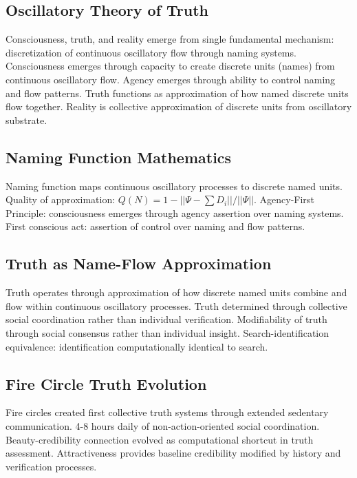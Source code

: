 \documentclass[12pt,a4paper]{article}
\begin{document}
\subsection{Oscillatory Theory of Truth}

Consciousness, truth, and reality emerge from single fundamental mechanism: discretization of continuous oscillatory flow through naming systems. Consciousness emerges through capacity to create discrete units (names) from continuous oscillatory flow. Agency emerges through ability to control naming and flow patterns. Truth functions as approximation of how named discrete units flow together. Reality is collective approximation of discrete units from oscillatory substrate.

\subsection{Naming Function Mathematics}

Naming function maps continuous oscillatory processes to discrete named units. Quality of approximation: $Q(N) = 1 - ||\Psi - \sum D_i|| / ||\Psi||$. Agency-First Principle: consciousness emerges through agency assertion over naming systems. First conscious act: assertion of control over naming and flow patterns.

\subsection{Truth as Name-Flow Approximation}

Truth operates through approximation of how discrete named units combine and flow within continuous oscillatory processes. Truth determined through collective social coordination rather than individual verification. Modifiability of truth through social consensus rather than individual insight. Search-identification equivalence: identification computationally identical to search.

\subsection{Fire Circle Truth Evolution}

Fire circles created first collective truth systems through extended sedentary communication. 4-8 hours daily of non-action-oriented social coordination. Beauty-credibility connection evolved as computational shortcut in truth assessment. Attractiveness provides baseline credibility modified by history and verification processes.
\end{document}
